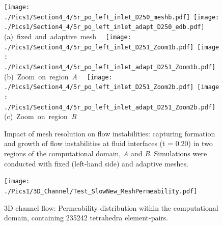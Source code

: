   \begin{figure}[ht]
  \vbox{\vspace{-.5cm}
      \hbox{\texttt{[image: ./Pics1/Section4\_4/5r\_po\_left\_inlet\_D250\_meshb.pdf]}
            \texttt{[image: ./Pics1/Section4\_4/5r\_po\_left\_inlet\_adapt\_D250\_edb.pdf]} }
      \vspace{-0.cm}\hbox{\hspace{4.5cm}(a) fixed and adaptive mesh  }\vspace{-0.cm}
      \hbox{ \texttt{[image: ./Pics1/Section4\_4/5r\_po\_left\_inlet\_D251\_Zoom1b.pdf]}
             \texttt{[image: ./Pics1/Section4\_4/5r\_po\_left\_inlet\_adapt\_D251\_Zoom1b.pdf]} }
      \vspace{-0.cm}\hbox{\hspace{4.5cm}(b) Zoom on region {\it A}  }\vspace{-0.cm}
      \hbox{ \texttt{[image: ./Pics1/Section4\_4/5r\_po\_left\_inlet\_D251\_Zoom2b.pdf]}
             \texttt{[image: ./Pics1/Section4\_4/5r\_po\_left\_inlet\_adapt\_D251\_Zoom2b.pdf]}}
      \vspace{-0.cm}\hbox{\hspace{4.5cm}(c) Zoom on region {\it B}  }\vspace{-0.cm}}
\caption{Impact of mesh resolution on flow instabilities: capturing formation and growth of flow instabilities at fluid interfaces (t = 0.20) in two regions of the computational domain, {\it A} and {\it B}. Simulations were conducted with fixed (left-hand side) and adaptive meshes. }
\label{fig:5regions_AdaptZoom}
\end{figure}
\clearpage



\begin{figure}[ht]
\vbox{\vspace{-.5cm}
      \hbox{\texttt{[image: ./Pics1/3D\_Channel/Test\_SlowNew\_MeshPermeability.pdf]} }}
\caption{3D channel flow: Permeability distribution within the computational domain, containing 235242  tetrahedra element-pairs.}
\label{fig:3DChannel_PermMesh}
\end{figure}
\clearpage




